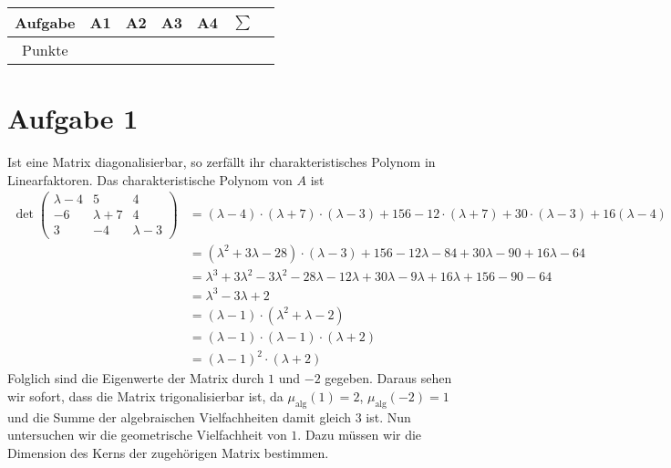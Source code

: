 \documentclass{article}
\newcommand{\malg}[1]{\mu_{\operatorname{alg}} \left( {#1} \right)}
\begin{document}
    \begin{tabular}{|c|m{1cm}|m{1cm}|m{1cm}|m{1cm}|m{1cm}|@{}m{0cm}@{}}
    	\hline
    	Aufgabe & \centering A1 & \centering A2 & \centering A3 & \centering A4 & \centering $\sum$ & \\[5mm] \hline
    	Punkte & & & & & & \\[5mm] \hline
    \end{tabular}
    \section*{Aufgabe 1}
    Ist eine Matrix diagonalisierbar, so zerfällt ihr charakteristisches Polynom in Linearfaktoren. Das charakteristische Polynom von $A$ ist 
    \begin{align*}
        \det
        \begin{pmatrix}
            \lambda - 4 & 5 & 4\\
            -6 & \lambda + 7 &4\\
            3 & -4 & \lambda - 3
        \end{pmatrix} &= (\lambda - 4)\cdot (\lambda + 7)\cdot (\lambda - 3) + 156- 12 \cdot (\lambda + 7) + 30 \cdot (\lambda - 3) + 16 (\lambda - 4)\\
        &= (\lambda ^2 + 3 \lambda - 28) \cdot (\lambda - 3) + 156 - 12 \lambda - 84 + 30 \lambda - 90 + 16 \lambda - 64\\
        &= \lambda^3 + 3 \lambda ^2 - 3 \lambda^2  - 28 \lambda - 12 \lambda + 30 \lambda - 9 \lambda + 16 \lambda + 156  - 90 - 64\\
        &= \lambda ^ 3 -3 \lambda + 2\\
        &= (\lambda - 1) \cdot (\lambda^2 + \lambda - 2)\\
        &= (\lambda - 1) \cdot (\lambda - 1) \cdot (\lambda + 2)\\
        &= (\lambda - 1)^2 \cdot (\lambda + 2)
    \end{align*}
    Folglich sind die Eigenwerte der Matrix durch $1$ und $-2$ gegeben.
    Daraus sehen wir sofort, dass die Matrix trigonalisierbar ist, da 
    $\malg{1} = 2$, $\malg{-2} = 1$ und die Summe der algebraischen Vielfachheiten damit gleich 3 ist.
    Nun untersuchen wir die geometrische Vielfachheit von $1$.
    Dazu müssen wir die Dimension des Kerns der zugehörigen Matrix bestimmen.
\end{document}
